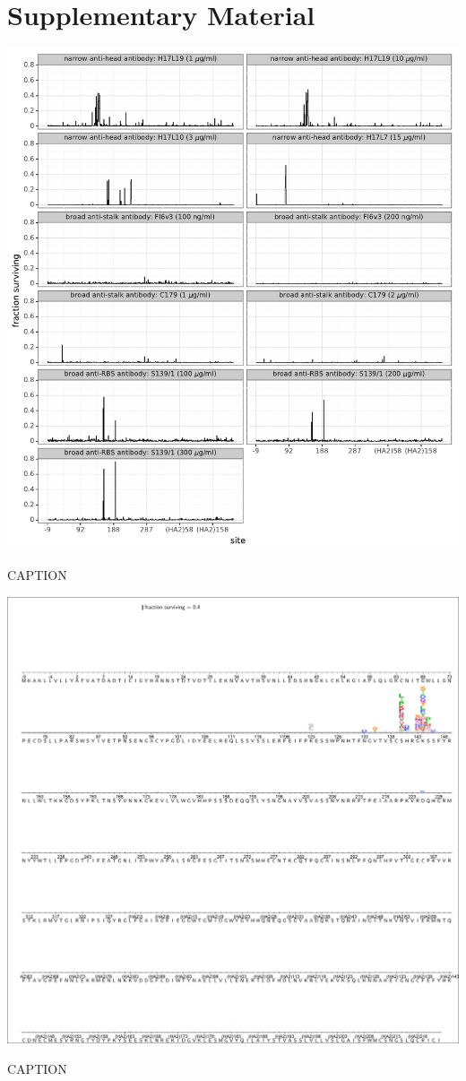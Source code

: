 \documentclass[11pt]{article}
\begin{document}
\section*{Supplementary Material}
\FloatBarrier

\begin{suppfigure}
\centerline{\includegraphics[width=\textwidth]{figs/maxfracsurvive.pdf}}
\caption{\label{suppfig:maxfracsurvive}
CAPTION}
\end{suppfigure}

\begin{suppfigure}
\centerline{\includegraphics[trim=0.1cm 0.02cm 0.1cm 0.03cm,clip=true,width=\textwidth]{figs/logoplots/H17L19_fracsurvive.pdf}}
\caption{\label{suppfig:H17L19logo}
CAPTION}
\end{suppfigure}
\end{document}
